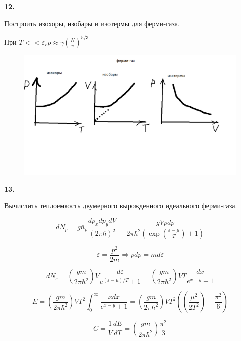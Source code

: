 \documentclass[a4paper,12pt]{article} %
\begin{document}
\begin{ttask}\textbf{12.} 
	
Построить изохоры, изобары и изотермы для ферми-газа. 

При $ T<<\varepsilon_{r}  p \approx \gamma\left(\frac{N}{v}\right)^{5 / 3} $




\begin{figure}[H]
	\centering
	\includegraphics[width=0.7\linewidth]{fermi_graphs}
	\caption{}
	\label{fig:fermigraphs}
\end{figure}












\end{ttask}


\begin{ttask}\textbf{13.} 

Вычислить теплоемкость двумерного вырожденного идеального ферми-газа. 




\[ dN_p = g \bar{n}_p \frac{d p_x d p_y d V }{(2\pi \hbar)^2}=
\frac{g V p dp}{2\pi \hbar^2 \left(\exp \left(\frac{\varepsilon-\mu }{T}\right)+1 \right) }
 \]

\[\varepsilon=\frac{p^2}{2m} \Rightarrow  p dp=m d \varepsilon\]

\[ dN_\varepsilon= \left(\frac{g m }{2\pi \hbar^2}\right) V \frac{d \varepsilon }{e^{(\varepsilon-\mu)/T}+1}=
\left(\frac{g m }{2\pi \hbar^2}\right) V T \frac{dx}{e^{x-y}+1}
\]

\[ E= \left(\frac{g m }{2\pi \hbar^2}\right) V T^2 \int_{0}^{\infty}\frac{x dx}{e^{x-y}+1}=
\left(\frac{g m }{2\pi \hbar^2}\right) V T^2 \left(  \left(\frac{\mu^2}{2T^2}\right)+\frac{\pi^2}{6}\right)\]


\[ C=\frac{1}{V}\frac{dE}{dT}=
\left(  \frac{g m }{2\pi \hbar^2}\right)\frac{\pi^2}{3} \]














\end{ttask}
\end{document}
